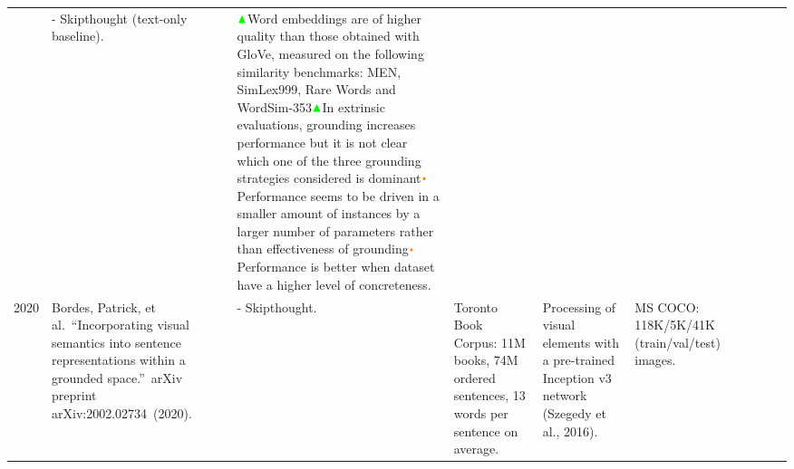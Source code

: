 \documentclass[
]{krantz}
\begin{document}
\begin{longtable}[]{@{}llllllllll@{}}
\begin{minipage}[t]{0.08\columnwidth}
\end{minipage} & \begin{minipage}[t]{0.05\columnwidth}\raggedright
- Skipthought (text-only baseline).\strut
\end{minipage} & \begin{minipage}[t]{0.13\columnwidth}\raggedright
\(\color{green}\blacktriangle\)Word embeddings are of higher quality than those obtained with GloVe, measured on the following similarity benchmarks: MEN, SimLex999, Rare Words and WordSim-353\(\color{green}\blacktriangle\)In extrinsic evaluations, grounding increases performance but it is not clear which one of the three grounding strategies considered is dominant\(\color{orange}\bullet\)Performance seems to be driven in a smaller amount of instances by a larger number of parameters rather than effectiveness of grounding\(\color{orange}\bullet\)Performance is better when dataset have a higher level of concreteness.\strut
\end{minipage}\tabularnewline
\begin{minipage}[t]{0.00\columnwidth}\raggedright
2020\strut
\end{minipage} & \begin{minipage}[t]{0.06\columnwidth}\raggedright
Bordes, Patrick, et al.~``Incorporating visual semantics into sentence representations within a grounded space.''~arXiv preprint arXiv:2002.02734~(2020).\strut
\end{minipage} & \begin{minipage}[t]{0.04\columnwidth}\raggedright
- Skipthought.\strut
\end{minipage} & \begin{minipage}[t]{0.02\columnwidth}\raggedright
Toronto Book Corpus: 11M books, 74M ordered sentences, 13 words per sentence on average.\strut
\end{minipage} & \begin{minipage}[t]{0.07\columnwidth}\raggedright
Processing of visual elements with a pre-trained Inception v3 network (Szegedy et al., 2016).\strut
\end{minipage} & \begin{minipage}[t]{0.05\columnwidth}\raggedright
MS COCO: 118K/5K/41K (train/val/test) images.\strut
\end{minipage} & \begin{minipage}[t]{0.25\columnwidth}\raggedright

\end{minipage}
\end{longtable}
\end{document}
